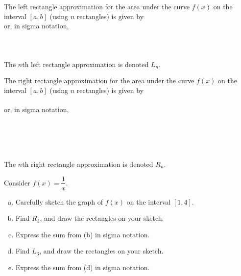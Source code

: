 \documentclass[notes]{subfiles}
\begin{document}
		\begin{rmk}
			The left rectangle approximation for the area under the curve $f(x)$ on the interval $[a,b]$ (using $n$ rectangles) is given by
				\vspace{.75in} \\
			
			or, in sigma notation,
				\\ \\ \\ \\
			
			The \(n\)th left rectangle approximation is denoted \(L_n\).
		\end{rmk}

		\begin{rmk}
			The right rectangle approximation for the area under the curve \(f(x)\) on the interval \([a,b]\) (using \(n\) rectangles) is given by\\[50pt]
			
				\vspace{.5in} \\
			
			or, in sigma notation,
			
				\\ \\ \\ \\
			
			The \(n\)th right rectangle approximation is denoted \(R_n\).
		\end{rmk}
			\newpage
			
		\begin{ex}
			Consider \(f(x) = \dfrac{1}{x}\).
			\begin{enumerate}[(a)]
				\item Carefully sketch the graph of \(f(x)\) on the interval \([1,4]\).
					
				\item Find \(R_3\), and draw the rectangles on your sketch.

				\item Express the sum from (b) in sigma notation.
					
				\item Find \(L_3\), and draw the rectangles on your sketch.
					
				\item Express the sum from (d) in sigma notation.
					
			\end{enumerate}
		\end{ex}
			\newpage
			
\end{document}
